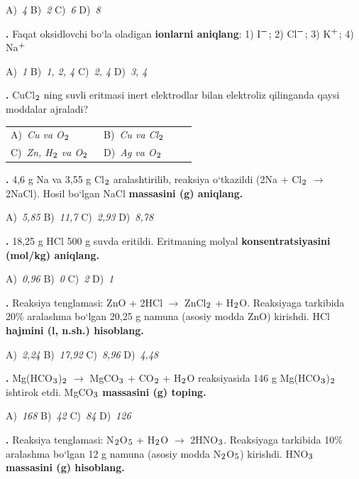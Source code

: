 \documentclass[11pt,a4paper]{article}
\renewcommand{\textsubscript}[1]{\ensuremath{_{\text{\fontsize{8}{8}\selectfont #1}}}}
\renewcommand{\textsuperscript}[1]{\ensuremath{^{\text{\fontsize{8}{8}\selectfont #1}}}}
\newcommand{\qn}[1]{\textbf{\fontsize{11.5}{13}\selectfont #1}}
\newcommand{\qsep}{\par\vspace{1pt}\noindent\rule{0pt}{0.4pt}\par\vspace{5pt}}
\begin{document}
\begin{multicols}{2}
\noindent A)~\textsl{4} \hfill B)~\textsl{2} \hfill C)~\textsl{6} \hfill D)~\textsl{8}\par
\qsep
\noindent\qn{10.} Faqat oksidlovchi bo`la oladigan \textbf{ionlarni aniqlang}: 1) I\textsuperscript{$-$}; 2) Cl\textsuperscript{$-$}; 3) K\textsuperscript{+}; 4) Na\textsuperscript{+}

\noindent A)~\textsl{1} \hfill B)~\textsl{1, 2, 4} \hfill C)~\textsl{2, 4} \hfill D)~\textsl{3, 4}\par
\qsep
\noindent\qn{11.} CuCl\textsubscript{2} ning suvli eritmasi inert elektrodlar bilan elektroliz qilinganda qaysi moddalar ajraladi?

\noindent\begin{tabular}{@{}p{0.47\linewidth}@{}p{0.47\linewidth}@{}}
A)~\textsl{Cu va O\textsubscript{2}} & B)~\textsl{Cu va Cl\textsubscript{2}} \\
C)~\textsl{Zn, H\textsubscript{2} va O\textsubscript{2}} & D)~\textsl{Ag va O\textsubscript{2}} \\
\end{tabular}\par
\qsep
\noindent\qn{12.} 4,6 g Na va 3,55 g Cl\textsubscript{2} aralashtirilib, reaksiya o`tkazildi (2Na + Cl\textsubscript{2} $\to$ 2NaCl). Hosil bo`lgan NaCl \textbf{massasini (g) aniqlang.}

\noindent A)~\textsl{5,85} \hfill B)~\textsl{11,7} \hfill C)~\textsl{2,93} \hfill D)~\textsl{8,78}\par
\qsep
\noindent\qn{13.} 18,25 g HCl 500 g suvda eritildi. Eritmaning molyal \textbf{konsentratsiyasini (mol/kg) aniqlang.}

\noindent A)~\textsl{0,96} \hfill B)~\textsl{0} \hfill C)~\textsl{2} \hfill D)~\textsl{1}\par
\qsep
\noindent\qn{14.} Reaksiya tenglamasi: ZnO + 2HCl $\to$ ZnCl\textsubscript{2} + H\textsubscript{2}O. Reaksiyaga tarkibida 20\% aralashma bo`lgan 20,25 g namuna (asosiy modda ZnO) kirishdi. HCl \textbf{hajmini (l, n.sh.) hisoblang.}

\noindent A)~\textsl{2,24} \hfill B)~\textsl{17,92} \hfill C)~\textsl{8,96} \hfill D)~\textsl{4,48}\par
\qsep
\noindent\qn{15.} Mg(HCO\textsubscript{3})\textsubscript{2} $\to$ MgCO\textsubscript{3} + CO\textsubscript{2} + H\textsubscript{2}O reaksiyasida 146 g Mg(HCO\textsubscript{3})\textsubscript{2} ishtirok etdi. MgCO\textsubscript{3} \textbf{massasini (g) toping.}

\noindent A)~\textsl{168} \hfill B)~\textsl{42} \hfill C)~\textsl{84} \hfill D)~\textsl{126}\par
\qsep
\noindent\qn{16.} Reaksiya tenglamasi: N\textsubscript{2}O\textsubscript{5} + H\textsubscript{2}O $\to$ 2HNO\textsubscript{3}. Reaksiyaga tarkibida 10\% aralashma bo`lgan 12 g namuna (asosiy modda N\textsubscript{2}O\textsubscript{5}) kirishdi. HNO\textsubscript{3} \textbf{massasini (g) hisoblang.}


\end{multicols}
\end{document}
